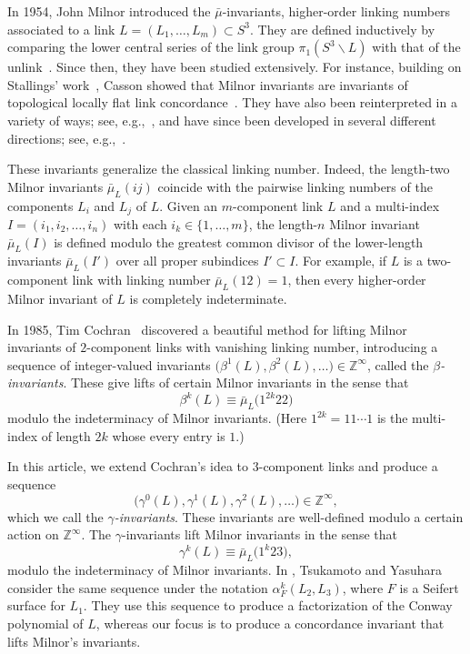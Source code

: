 \documentclass[a4paper, 11pt]{amsart}
\theoremstyle{definition}
\newcommand{\Z}{\mathbb{Z}}
\begin{document}
In 1954, John Milnor introduced the $\bar{\mu}$-invariants, higher-order linking numbers associated to a link
$L=(L_1,\ldots,L_m)\subset S^3$. They are defined inductively by comparing the lower central series of the
link group $\pi_1(S^3\smallsetminus L)$ with that of the unlink~\cite{Milnor1954}. Since then, they have been
studied extensively. For instance, building on Stallings' work~\cite{Sta65}, Casson showed that Milnor invariants are invariants of topological locally flat link concordance~\cite{Cas75}.  They have also been reinterpreted in a variety of ways; see, e.g.,~\cites{Dw, Tur76, Porter80, Orr89, Coc90, Hab1, HM00, CST14}, and have since been developed in several different directions; see, e.g.,~\cites{Orr:1991, Krushkal:1998, Cha:2006, CST:2012, CST:2017, Cha:2018, DNOP:2020, Park-Powell:2022, Stees:2025, Kuzbary:2024, Cha-Orr:2024, CST:2025}.


These invariants generalize the classical linking number. Indeed, the length-two Milnor invariants
$\bar{\mu}_L(ij)$ coincide with the pairwise linking numbers of the components $L_i$ and $L_j$ of $L$.
Given an $m$-component link $L$ and a multi-index $I=(i_1,i_2,\dots,i_n)$ with each
$i_k\in\{1,\ldots,m\}$, the length-$n$ Milnor invariant $\bar{\mu}_L(I)$ is defined modulo the greatest
common divisor of the lower-length invariants $\bar{\mu}_L(I')$ over all proper subindices $I'\subset I$.
For example, if $L$ is a two-component link with linking number $\bar{\mu}_L(12)=1$, then every
higher-order Milnor invariant of $L$ is completely indeterminate.

In 1985, Tim Cochran~\cite{C3} discovered a beautiful method for lifting Milnor invariants
of $2$-component links with vanishing linking number, introducing a sequence of integer-valued
invariants $\bigl(\beta^1(L),\beta^2(L),\dots\bigr)\in \Z^\infty$, called the \emph{$\beta$-invariants}.
These give lifts of certain Milnor invariants in the sense that
\[
\beta^k(L)\equiv \bar{\mu}_L\bigl(1^{2k}22\bigr)
\]
modulo the indeterminacy of Milnor invariants. (Here $1^{2k}=11\cdots 1$ is the multi-index of
length $2k$ whose every entry is $1$.)

In this article, we extend Cochran's idea to $3$-component links and produce a sequence
\[ \bigl(\gamma^0(L),\gamma^1(L),\gamma^2(L),\dots\bigr)\in \Z^\infty, \] which we call the \emph{$\gamma$-invariants}. These invariants are well-defined modulo a certain action on $\Z^\infty$.
The $\gamma$-invariants lift Milnor invariants in the sense that
\[
\gamma^k(L)\equiv \bar{\mu}_L\bigl(1^k23\bigr),
\]
 modulo the indeterminacy of Milnor invariants.  {In \cite{Tsukamoto-Yasuhara:2007}, Tsukamoto and Yasuhara consider the same
sequence under the notation $\alpha^k_F(L_2,L_3)$, where $F$ is a Seifert surface for $L_1$. They use this sequence to produce a factorization of the Conway polynomial of $L$, whereas our focus is to produce a concordance invariant that lifts Milnor's invariants.}
\end{document}
